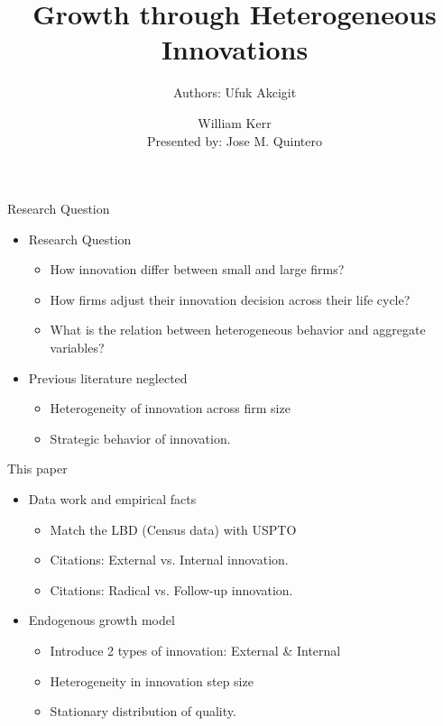 \documentclass[usenames,dvipsnames,aspectratio=169]{beamer}
\title{Growth through Heterogeneous Innovations }
\author{Authors: Ufuk Akcigit \and William Kerr \\ \small{Presented by: Jose M. Quintero} }
\begin{document}
\begin{frame}
  \titlepage
\end{frame}

\begin{frame}{Research Question}
\begin{itemize}[label=\textcolor{teal}{$\blacktriangleright$}]
\vfill
\item Research Question
\begin{itemize}[label=\textcolor{teal}{$\star$}]
\item How innovation differ between small and large firms? 
\item How firms adjust their innovation decision across their life cycle?
\item What is the relation between heterogeneous behavior and aggregate variables? 
\end{itemize}
\vfill
\item Previous literature neglected
\begin{itemize}[label=\textcolor{teal}{$\star$}]
\item Heterogeneity of innovation across firm size
\item Strategic behavior of innovation. 
\end{itemize}
\vfill
\end{itemize}
\end{frame}

\begin{frame}{This paper}
\begin{itemize}[label=\textcolor{teal}{$\blacktriangleright$}]
\item Data work and empirical facts
\begin{itemize}[label=\textcolor{teal}{$\star$}]
\item Match the LBD (Census data) with USPTO
\item Citations: External vs. Internal innovation. 
\item Citations: Radical vs. Follow-up innovation. 
\end{itemize}
\vfill
\item Endogenous growth model
\begin{itemize}[label=\textcolor{teal}{$\star$}]
\item Introduce 2 types of innovation: External \& Internal
\item Heterogeneity in innovation step size
\item Stationary distribution of quality.
\end{itemize}
\end{itemize}
\end{frame}
\end{document}
